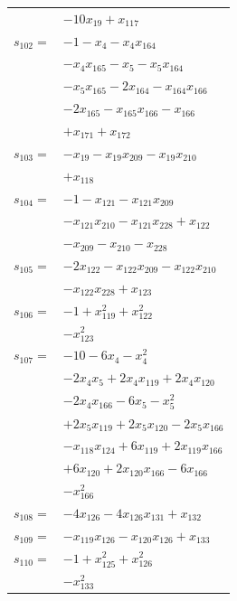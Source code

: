 \begin{longtable}{@{}r@{\;}l@{}}
 & \(\displaystyle -10x_{19} +x_{117}\) \\[3pt]
\(s_{102}=\) & \(\displaystyle -1 -x_{4} -x_{4}x_{164}\) \\
 & \(\displaystyle -x_{4}x_{165} -x_{5} -x_{5}x_{164}\) \\
 & \(\displaystyle -x_{5}x_{165} -2x_{164} -x_{164}x_{166}\) \\
 & \(\displaystyle -2x_{165} -x_{165}x_{166} -x_{166}\) \\
 & \(\displaystyle +x_{171} +x_{172}\) \\[3pt]
\(s_{103}=\) & \(\displaystyle -x_{19} -x_{19}x_{209} -x_{19}x_{210}\) \\
 & \(\displaystyle +x_{118}\) \\[3pt]
\(s_{104}=\) & \(\displaystyle -1 -x_{121} -x_{121}x_{209}\) \\
 & \(\displaystyle -x_{121}x_{210} -x_{121}x_{228} +x_{122}\) \\
 & \(\displaystyle -x_{209} -x_{210} -x_{228}\) \\[3pt]
\(s_{105}=\) & \(\displaystyle -2x_{122} -x_{122}x_{209} -x_{122}x_{210}\) \\
 & \(\displaystyle -x_{122}x_{228} +x_{123}\) \\[3pt]
\(s_{106}=\) & \(\displaystyle -1 +x_{119}^{2} +x_{122}^{2}\) \\
 & \(\displaystyle -x_{123}^{2}\) \\[3pt]
\(s_{107}=\) & \(\displaystyle -10 -6x_{4} -x_{4}^{2}\) \\
 & \(\displaystyle -2x_{4}x_{5} +2x_{4}x_{119} +2x_{4}x_{120}\) \\
 & \(\displaystyle -2x_{4}x_{166} -6x_{5} -x_{5}^{2}\) \\
 & \(\displaystyle +2x_{5}x_{119} +2x_{5}x_{120} -2x_{5}x_{166}\) \\
 & \(\displaystyle -x_{118}x_{124} +6x_{119} +2x_{119}x_{166}\) \\
 & \(\displaystyle +6x_{120} +2x_{120}x_{166} -6x_{166}\) \\
 & \(\displaystyle -x_{166}^{2}\) \\[3pt]
\(s_{108}=\) & \(\displaystyle -4x_{126} -4x_{126}x_{131} +x_{132}\) \\[3pt]
\(s_{109}=\) & \(\displaystyle -x_{119}x_{126} -x_{120}x_{126} +x_{133}\) \\[3pt]
\(s_{110}=\) & \(\displaystyle -1 +x_{125}^{2} +x_{126}^{2}\) \\
 & \(\displaystyle -x_{133}^{2}\) \\[3pt]

\end{longtable}
